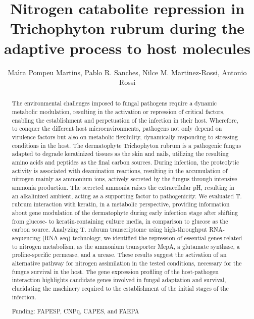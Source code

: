 \documentclass[twoside]{article}
\title{\vspace{-15mm}\fontsize{24pt}{10pt}\selectfont\textbf{ Nitrogen catabolite repression in Trichophyton rubrum during the adaptive process to host molecules }} %
\author{ Ma\'{\i}ra Pompeu Martins, Pablo R. Sanches, Nilce M. Martinez-Rossi, Antonio Rossi }
\affil{  }
\date{}
\begin{document}
  
  
  \maketitle %
  
  
  \thispagestyle{fancy} %
  
  
  \begin{abstract}
  The environmental challenges imposed to fungal pathogens require a dynamic metabolic modulation,  resulting in the activation or repression of critical factors,  enabling the establishment and perpetuation of the infection in their host. Wherefore,  to conquer the different host microenvironments,  pathogens not only depend on virulence factors but also on metabolic flexibility,  dynamically responding to stressing conditions in the host. The dermatophyte Trichophyton rubrum is a pathogenic fungus adapted to degrade keratinized tissues as the skin and nails,  utilizing the resulting amino acids and peptides as the final carbon sources. During infection,  the proteolytic activity is associated with deamination reactions,  resulting in the accumulation of nitrogen mainly as ammonium ions,  actively secreted by the fungus through intensive ammonia production. The secreted ammonia raises the extracellular pH,  resulting in an alkalinized ambient,  acting as a supporting factor to pathogenicity. We evaluated T. rubrum interaction with keratin,  in a metabolic perspective,  providing information about gene modulation of the dermatophyte during early infection stage after shifting from glucose- to keratin-containing culture media,  in comparison to glucose as the carbon source. Analyzing T. rubrum transcriptome using high-throughput RNA-sequencing (RNA-seq) technology,  we identified the repression of essential genes related to nitrogen metabolism,  as the ammonium transporter MepA,  a glutamate synthase,  a proline-specific permease,  and a urease. These results suggest the activation of an alternative pathway for nitrogen assimilation in the tested conditions,  necessary for the fungus survival in the host. The gene expression profiling of the host-pathogen interaction highlights candidate genes involved in fungal adaptation and survival,  elucidating the machinery required to the establishment of the initial stages of the infection.
  
  Funding: FAPESP,  CNPq,  CAPES,  and FAEPA \\ 
  \end{abstract}
  
\end{document}
